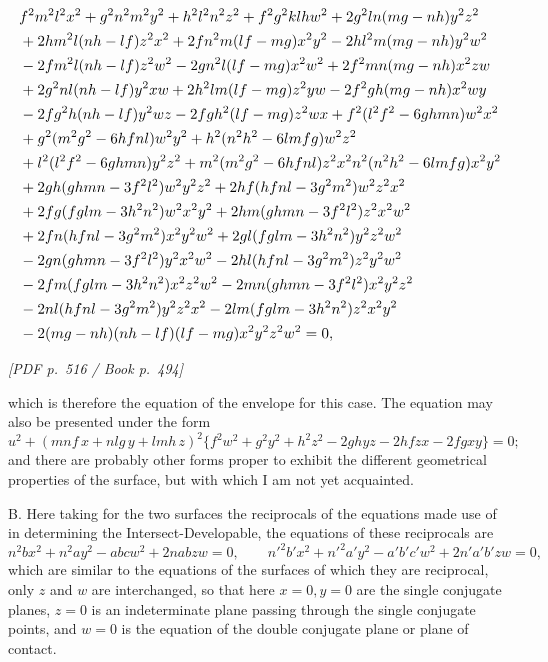 \documentclass[11pt]{article}
\newcommand{\Page}[2]{\bigskip\noindent\textit{[PDF p.~#1 / Book p.~#2]}\par\smallskip}
\begin{document}
\[
\resizebox{\textwidth}{!}{$\displaystyle
\begin{aligned}
&f^2m^2l^2x^2+g^2n^2m^2y^2+h^2l^2n^2z^2
+f^2g^2klhw^2
+2g^2ln(mg-nh)y^2z^2\\
&+2hm^2l(nh-lf)z^2x^2+2fn^2m(lf-mg)x^2y^2
-2hl^2m(mg-nh)y^2w^2\\
&-2fm^2l(nh-lf)z^2w^2-2gn^2l(lf-mg)x^2w^2
+2f^2mn(mg-nh)x^2zw\\
&+2g^2nl(nh-lf)y^2xw+2h^2lm(lf-mg)z^2yw
-2f^2gh(mg-nh)x^2wy\\
&-2fg^2h(nh-lf)y^2wz-2fgh^2(lf-mg)z^2wx
+f^2(l^2f^2-6ghmn)w^2x^2\\
&+g^2(m^2g^2-6hfnl)w^2y^2+h^2(n^2h^2-6lmfg)w^2z^2\\
&+l^2(l^2f^2-6ghmn)y^2z^2+m^2(m^2g^2-6hfnl)z^2x^2
n^2(n^2h^2-6lmfg)x^2y^2\\
&+2gh(ghmn-3f^2l^2)w^2y^2z^2+2hf(hfnl-3g^2m^2)w^2z^2x^2\\
&+2fg(fglm-3h^2n^2)w^2x^2y^2
+2hm(ghmn-3f^2l^2)z^2x^2w^2\\
&+2fn(hfnl-3g^2m^2)x^2y^2w^2
+2gl(fglm-3h^2n^2)y^2z^2w^2\\
&-2gn(ghmn-3f^2l^2)y^2x^2w^2
-2hl(hfnl-3g^2m^2)z^2y^2w^2\\
&-2fm(fglm-3h^2n^2)x^2z^2w^2
-2mn(ghmn-3f^2l^2)x^2y^2z^2\\
&-2nl(hfnl-3g^2m^2)y^2z^2x^2
-2lm(fglm-3h^2n^2)z^2x^2y^2\\
&-2(mg-nh)(nh-lf)(lf-mg)x^2y^2z^2w^2=0,
\end{aligned}$}
\]

\Page{516}{494}

\noindent which is therefore the equation of the envelope for this case. The equation may also
be presented under the form
\[
        u^2+(mnf\,x+nlg\,y+lmh\,z)^2
        \{f^2w^2+g^2y^2+h^2z^2-2ghyz-2hfzx-2fgxy\}=0;
\]
and there are probably other forms proper to exhibit the different geometrical
properties of the surface, but with which I am not yet acquainted.

B. Here taking for the two surfaces the reciprocals of the equations made use of in
determining the Intersect-Developable, the equations of these reciprocals are
\[
        n^2bx^2+n^2ay^2-abcw^2+2nabzw=0,\qquad
        n'^2b'x^2+n'^2a'y^2-a'b'c'w^2+2n'a'b'zw=0,
\]
which are similar to the equations of the surfaces of which they are reciprocal, only
$z$ and $w$ are interchanged, so that here $x=0,y=0$ are the single conjugate planes,
$z=0$ is an indeterminate plane passing through the single conjugate points, and
$w=0$ is the equation of the double conjugate plane or plane of contact.
\end{document}
